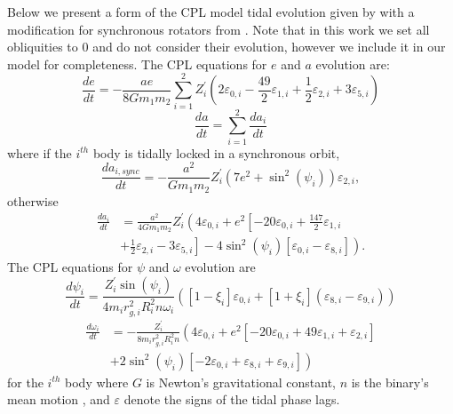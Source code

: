 Below we present a form of the CPL model tidal evolution given by \citet{Heller2011} with a modification for synchronous rotators from \citet{FerrazMello2008}.  Note that in this work we set all obliquities to 0 and do not consider their evolution, however we include it in our model for completeness.  The CPL equations for $e$ and $a$ evolution are:
\begin{equation} \label{eqn:cpl_dedt}
\frac{de}{dt} = -\frac{ae}{8 G m_1 m_2} \sum_{i=1}^2 Z_i^{'} \left( 2 \varepsilon_{0,i} - \frac{49}{2} \varepsilon_{1,i} + \frac{1}{2} \varepsilon_{2,i} + 3 \varepsilon_{5,i} \right)
\end{equation}
\begin{equation} \label{eqn:cpl_dadt_net}
\frac{da}{dt} = \sum_{i=1}^2 \frac{da_i}{dt}
\end{equation}
where if the $i^{th}$ body is tidally locked in a synchronous orbit,
\begin{equation} \label{eqn:cpl_dadt_locked}
\frac{da_{i,sync}}{dt} = -\frac{a^2}{G m_1 m_2} Z_i^{'} \left( 7 e^2 + \sin^2 (\psi_i) \right) \varepsilon_{2,i},
\end{equation}
otherwise
\begin{equation}
\begin{split}
\frac{da_i}{dt} & = \frac{a^2}{4 G m_1 m_2} Z_i^{'} \left( 4 \varepsilon_{0,i} + e^2 \left[ -20 \varepsilon_{0,i} + \frac{147}{2} \varepsilon_{1,i} \right. \right. \\
&  + \left. \left. \frac{1}{2} \varepsilon_{2,i} - 3 \varepsilon_{5,i} \right] - 4 \sin^2 (\psi_i) \left[ \varepsilon_{0,i} - \varepsilon_{8,i} \right] \right).
\end{split}
\end{equation}
The CPL equations for $\psi$ and $\omega$ evolution are
\begin{equation} \label{eqn:cpl_dpsidt}
\frac{d\psi_i}{dt} = \frac{Z_i^{'} \sin(\psi_i)}{4 m_i r_{g,i}^2 R_i^2 n \omega_i} \left( [1-\xi_i] \varepsilon_{0,i} + [1+\xi_i](\varepsilon_{8,i} - \varepsilon_{9,i}) \right)
\end{equation}
\begin{equation} \label{eqn:cpl_dwdt}
\begin{split}
\frac{d\omega_i}{dt}& = -\frac{Z_i^{'}}{8m_i r_{g,i}^2 R_i^2 n} \left(4 \varepsilon_{0,i} + e^2\left[-20\varepsilon_{0,i} + 49\varepsilon_{1,i} + \varepsilon_{2,i} \right] \right. \\
& \left. + 2 \sin^2(\psi_i) \left[ -2 \varepsilon_{0,i} + \varepsilon_{8,i} + \varepsilon_{9,i} \right] \right)
\end{split}
\end{equation}
for the $i^{th}$ body where $G$ is Newton's gravitational constant, $n$ is the binary's mean motion , and $\varepsilon$ denote the signs of the tidal phase lags.


